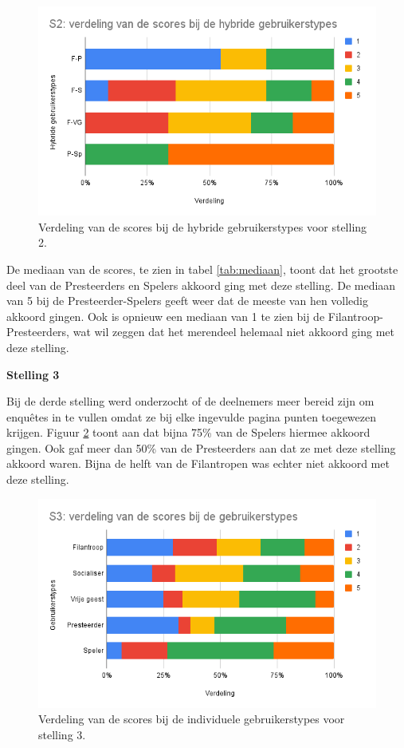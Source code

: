 \begin{figure}
    \includegraphics[width=\linewidth]{S2_Hybride.png}
    \caption{Verdeling van de scores bij de hybride gebruikerstypes voor stelling 2.}
    \label{fig:s2_hybride}
\end{figure}

De mediaan van de scores, te zien in tabel \ref{tab:mediaan}, toont dat het grootste deel van de Presteerders en Spelers akkoord ging met deze stelling. De mediaan van 5 bij de Presteerder-Spelers geeft weer dat de meeste van hen volledig akkoord gingen. Ook is opnieuw een mediaan van 1 te zien bij de Filantroop-Presteerders, wat wil zeggen dat het merendeel helemaal niet akkoord ging met deze stelling.

\textbf{Stelling 3}

Bij de derde stelling werd onderzocht of de deelnemers meer bereid zijn om enquêtes in te vullen omdat ze bij elke ingevulde pagina punten toegewezen krijgen. Figuur \ref{fig:s3} toont aan dat bijna 75\% van de Spelers hiermee akkoord gingen. Ook gaf meer dan 50\% van de Presteerders aan dat ze met deze stelling akkoord waren. Bijna de helft van de Filantropen was echter niet akkoord met deze stelling.

\begin{figure}
    \includegraphics[width=\linewidth]{S3.png}
    \caption{Verdeling van de scores bij de individuele gebruikerstypes voor stelling 3.}
    \label{fig:s3}
\end{figure}

